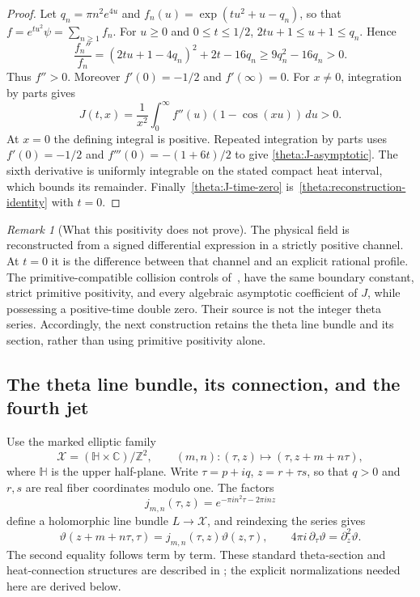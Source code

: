 \documentclass[11pt]{article}
\numberwithin{equation}{section}
\theoremstyle{definition}
\theoremstyle{remark}
\newtheorem{remark}[theorem]{Remark}
\begin{document}
\begin{proof}
Let $q_n=\pi n^2e^{4u}$ and
$f_n(u)=\exp(tu^2+u-q_n)$, so that $f=e^{tu^2}\psi=\sum_{n\geq1}f_n$.
For $u\geq0$ and $0\leq t\leq1/2$,
$2tu+1\leq u+1\leq q_n$.  Hence
\[
 \frac{f_n''}{f_n}
 =(2tu+1-4q_n)^2+2t-16q_n
 \geq9q_n^2-16q_n>0.
\]
Thus $f''>0$.  Moreover $f'(0)=-1/2$ and $f'(\infty)=0$.
For $x\ne0$, integration by parts gives
\begin{equation}
 J(t,x)=\frac1{x^2}\int_0^\infty f''(u)(1-\cos(xu))\,du>0.
 \label{theta:convex-cosine}
\end{equation}
At $x=0$ the defining integral is positive.  Repeated integration by parts
uses $f'(0)=-1/2$ and $f'''(0)=-(1+6t)/2$ to give
\eqref{theta:J-asymptotic}.  The sixth derivative is uniformly integrable
on the stated compact heat interval, which bounds its remainder.
Finally~\eqref{theta:J-time-zero} is~\eqref{theta:reconstruction-identity}
with $t=0$.
\end{proof}

\begin{remark}[What this positivity does not prove]
\label{theta:primitive-limit}
The physical field is reconstructed from a signed differential expression
in a strictly positive channel.  At $t=0$ it is the difference between that
channel and an explicit rational profile.  The primitive-compatible
collision controls of~\cite{BakerControl}, have the same boundary
constant, strict primitive positivity, and every algebraic asymptotic
coefficient of $J$, while possessing a positive-time double zero.
Their source is not the integer theta series.  Accordingly, the next
construction retains the theta line bundle and its section, rather than
using primitive positivity alone.
\end{remark}

\subsection{The theta line bundle, its connection, and the fourth jet}
\label{theta:line-bundle}

Use the marked elliptic family
\[
 \mathcal X=(\mathbb H\times\mathbb C)/\mathbb Z^2,
 \qquad (m,n):(\tau,z)\longmapsto(\tau,z+m+n\tau),
\]
where $\mathbb H$ is the upper half-plane.  Write $\tau=p+iq$,
$z=r+\tau s$, so that $q>0$ and $r,s$ are real fiber coordinates modulo
one.  The factors
\begin{equation}
 j_{m,n}(\tau,z)=e^{-\pi i n^2\tau-2\pi i nz}
 \label{theta:multipliers}
\end{equation}
define a holomorphic line bundle $L\to\mathcal X$, and reindexing the
series gives
\begin{equation}
 \vartheta(z+m+n\tau,\tau)=j_{m,n}(\tau,z)\vartheta(z,\tau),
 \qquad 4\pi i\,\partial_\tau\vartheta=\partial_z^2\vartheta.
 \label{theta:automorphy-heat}
\end{equation}
The second equality follows term by term.  These standard theta-section
and heat-connection structures are described in
\cite[Section~6]{AndersenBlaavand2011}; the explicit normalizations needed
here are derived below.
\end{document}
